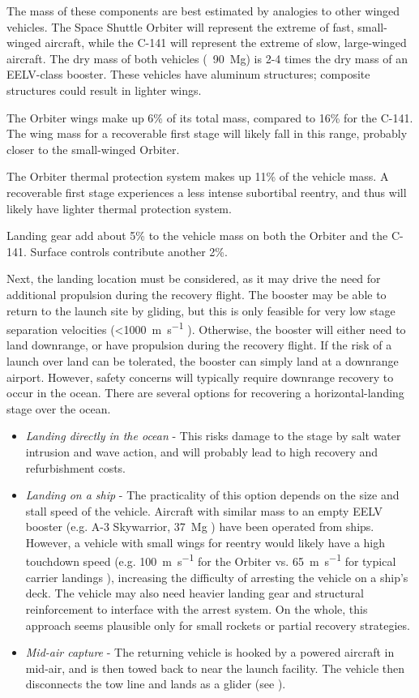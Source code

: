 \documentclass[conf]{new-aiaa}
\begin{document}
The mass of these components are best estimated by analogies to other winged vehicles. The Space Shuttle Orbiter will represent the extreme of fast, small-winged aircraft, while the C-141 will represent the extreme of slow, large-winged aircraft. The dry mass of both vehicles (~\SI{90}{\mega\gram}) is 2-4 times the dry mass of an EELV-class booster. These vehicles have aluminum structures; composite structures could result in lighter wings.

The Orbiter wings make up 6\% of its total mass, compared to 16\% for the C-141. The wing mass for a recoverable first stage will likely fall in this range, probably closer to the small-winged Orbiter.

The Orbiter thermal protection system makes up 11\% of the vehicle mass. A recoverable first stage experiences a less intense subortibal reentry, and thus will likely have lighter thermal protection system.

Landing gear add about 5\% to the vehicle mass on both the Orbiter and the C-141. Surface controls contribute another 2\%.

Next, the landing location must be considered, as it may drive the need for additional propulsion during the recovery flight. The booster may be able to return to the launch site by gliding, but this is only feasible for very low stage separation velocities (<\SI{1000}{\meter\per\second} \cite{Hellman2005} \cite{Healy1998}). Otherwise, the booster will either need to land downrange, or have propulsion during the recovery flight. If the risk of a launch over land can be tolerated, the booster can simply land at a downrange airport. However, safety concerns will typically require downrange recovery to occur in the ocean. There are several options for recovering a horizontal-landing stage over the ocean.
 
 \begin{itemize}
 	\item \emph{Landing directly in the ocean} - This risks damage to the stage by salt water intrusion and wave action, and will probably lead to high recovery and refurbishment costs.
 	\item \emph{Landing on a ship} - The practicality of this option depends on the size and stall speed of the vehicle. Aircraft with similar mass to an empty EELV booster (e.g. A-3 Skywarrior, \SI{37}{\mega\gram} \cite{DouglasA3}) have been operated from ships. However, a vehicle with small wings for reentry would likely have a high touchdown speed (e.g. \SI{100}{\meter\per\second} for the Orbiter \cite{ShuttleLanding} vs. \SI{65}{\meter\per\second} for typical carrier landings \cite{Shen2013}), increasing the difficulty of arresting the vehicle on a ship's deck. The vehicle may also need heavier landing gear and structural reinforcement to interface with the arrest system. On the whole, this approach seems plausible only for small rockets or partial recovery strategies.
 	\item \emph{Mid-air capture} - The returning vehicle is hooked by a powered aircraft in mid-air, and is then towed back to near the launch facility. The vehicle then disconnects the tow line and lands as a glider (see \cite{Stappert2017}).
 \end{itemize}
\end{document}
